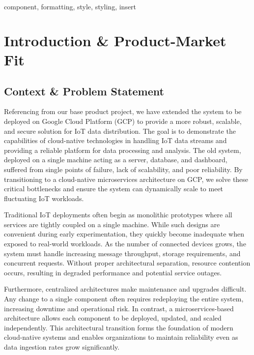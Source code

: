 \documentclass[conference]{IEEEtran}
\begin{document}
\begin{IEEEkeywords}
component, formatting, style, styling, insert
\end{IEEEkeywords}


\section{Introduction \& Product-Market Fit}
\subsection{Context \& Problem Statement}
Referencing from our base product project, we have extended the system to be deployed on Google Cloud Platform (GCP) to provide a more robust, scalable, and secure solution for IoT data distribution. The goal is to demonstrate the capabilities of cloud-native technologies in handling IoT data streams and providing a reliable platform for data processing and analysis. The old system, deployed on a single machine acting as a server, database, and dashboard, suffered from single points of failure, lack of scalability, and poor reliability. By transitioning to a cloud-native microservices architecture on GCP, we solve these critical bottlenecks and ensure the system can dynamically scale to meet fluctuating IoT workloads.

Traditional IoT deployments often begin as monolithic prototypes where all services are tightly coupled on a single machine. While such designs are convenient during early experimentation, they quickly become inadequate when exposed to real-world workloads. As the number of connected devices grows, the system must handle increasing message throughput, storage requirements, and concurrent requests. Without proper architectural separation, resource contention occurs, resulting in degraded performance and potential service outages.

Furthermore, centralized architectures make maintenance and upgrades difficult. Any change to a single component often requires redeploying the entire system, increasing downtime and operational risk. In contrast, a microservices-based architecture allows each component to be deployed, updated, and scaled independently. This architectural transition forms the foundation of modern cloud-native systems and enables organizations to maintain reliability even as data ingestion rates grow significantly.
\end{document}
